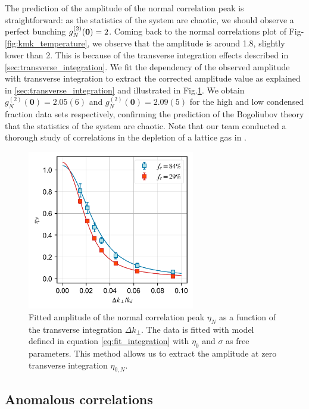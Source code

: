 The prediction of the amplitude of the normal correlation peak is straightforward: as the statistics of the system are chaotic, we should observe a perfect bunching $g^{(2)}_N (\bm{0})=2$.
Coming back to the normal correlations plot of Fig-\ref{fig:kmk_temperature}, we observe that the amplitude is around 1.8, \ie slightly lower than 2. This is because of the transverse integration effects described in \ref{sec:transverse_integration}. We fit the dependency of the observed amplitude with transverse integration to extract the corrected amplitude value as explained in \ref{sec:transverse_integration} and illustrated in Fig.\ref{fig:integration_kk}. We obtain $g^{(2)}_N(\bm{0})=2.05(6)$ and $g^{(2)}_N(\bm{0})=2.09(5)$ for the high and low condensed fraction data sets respectively, confirming the prediction of the Bogoliubov theory that the statistics of the system are chaotic. Note that our team conducted a thorough study of \kk correlations in the depletion of a lattice gas in \cite{cayla2020}. 

\begin{figure}
    \centering
    \includegraphics[width=0.65\textwidth]{Fig/Chapter4/eta_vs_int_kk.png}
    \caption{Fitted amplitude of the normal correlation peak $\eta_N$ as a function of the transverse integration $\Delta k_{\perp}$. The data is fitted with model defined in equation \ref{eq:fit_integration} with $\eta_0$ and $\sigma$ as free parameters. This method allows us to extract the amplitude at zero transverse integration $\eta_{0,N}$.}
    \label{fig:integration_kk}
\end{figure}

\subsection{Anomalous correlations}

